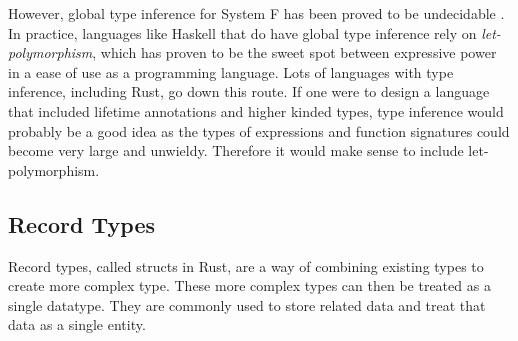 However, global type inference for System F has been proved to be undecidable
\cite{tapl} \cite{attapl}. In practice, languages like Haskell that do have
global type inference rely on \textit{let-polymorphism}, which has proven to be
the sweet spot between expressive power in a ease of use as a programming
language. Lots of languages with type inference, including Rust, go down this
route. If one were to design a language that included lifetime annotations and
higher kinded types, type inference would probably be a good idea as the types
of expressions and function signatures could become very large and unwieldy.
Therefore it would make sense to include let-polymorphism.

\subsection{Record Types}
Record types, called structs in Rust, are a way of combining existing types to
create more complex type. These more complex types can then be treated as a
single datatype. They are commonly used to store related data and treat that
data as a single entity.

